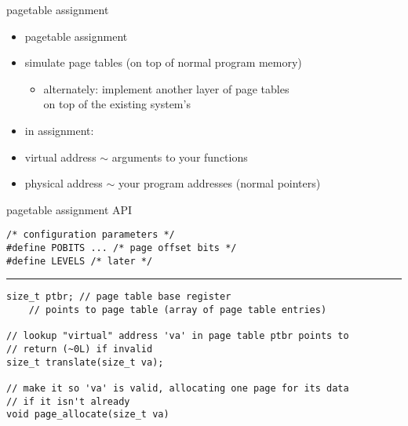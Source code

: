 \usetikzlibrary{matrix}
\begin{frame}{pagetable assignment}
    \begin{itemize}
    \item pagetable assignment
    \item simulate page tables (on top of normal program memory)
        \begin{itemize}
            \item alternately: implement another layer of page tables \\
                on top of the existing system's
        \end{itemize}
    \vspace{.5cm}
    \item in assignment:
    \item virtual address $\sim$ arguments to your functions
    \item physical address $\sim$ your program addresses (normal pointers)
    \end{itemize}
\end{frame}

\begin{frame}[fragile,label=asgnAPI]{pagetable assignment API}
\lstset{language=C,style=smaller}
\begin{lstlisting}
/* configuration parameters */
#define POBITS ... /* page offset bits */
#define LEVELS /* later */
\end{lstlisting}
\hrule
\begin{lstlisting}
size_t ptbr; // page table base register
    // points to page table (array of page table entries)

// lookup "virtual" address 'va' in page table ptbr points to
// return (~0L) if invalid
size_t translate(size_t va);

// make it so 'va' is valid, allocating one page for its data
// if it isn't already
void page_allocate(size_t va)
\end{lstlisting}
\end{frame}

